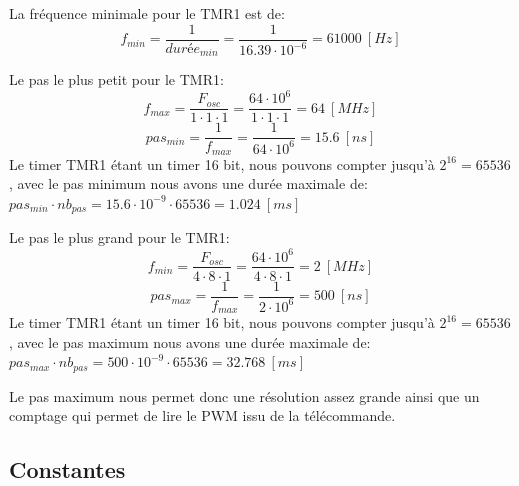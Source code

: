 \documentclass[fleqn, 11pt, a4paper]{article}
\begin{document}
  La fréquence minimale pour le TMR1 est de:
  $$f_{min} = \frac{1}{durée_{min}} = \frac{1}{16.39 \cdot 10^{-6}} = 61000\ [Hz]$$
  
  Le pas le plus petit pour le TMR1:
  $$f_{max} = \frac{F_{osc}}{1 \cdot 1 \cdot 1} = \frac{64 \cdot 10^{6}}{1 \cdot 1 \cdot 1} = 64\ [MHz]$$
  $$pas_{min} = \frac{1}{f_{max}}= \frac{1}{64 \cdot 10^{6}} = 15.6\ [ns]$$
  Le timer TMR1 étant un timer 16 bit, nous pouvons compter jusqu'à $2^{16} = 65536$, avec le pas minimum nous avons une durée maximale de: $pas_{min} \cdot nb_{pas} = 15.6 \cdot 10^{-9} \cdot 65536 = 1.024\ [ms]$
  
  Le pas le plus grand pour le TMR1:
    $$f_{min} = \frac{F_{osc}}{4 \cdot 8 \cdot 1} = \frac{64 \cdot 10^{6}}{4 \cdot 8 \cdot 1} = 2\ [MHz]$$
  $$pas_{max} = \frac{1}{f_{max}}= \frac{1}{2 \cdot 10^{6}} = 500\ [ns]$$
    Le timer TMR1 étant un timer 16 bit, nous pouvons compter jusqu'à $2^{16} = 65536$, avec le pas maximum nous avons une durée maximale de: $pas_{max} \cdot nb_{pas} = 500 \cdot 10^{-9} \cdot 65536 = 32.768\ [ms]$
    
    Le pas maximum nous permet donc une résolution assez grande ainsi que un comptage qui permet de lire le PWM issu de la télécommande.
  
  
	\newpage
	\begin{appendix}
	\section{Constantes}

	
	\end{appendix}
	
	
\end{document}
